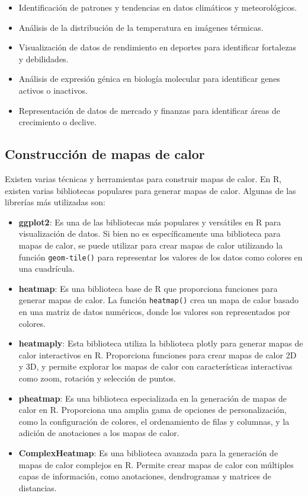 \documentclass{article}
\begin{document}
\begin{itemize}
    \item Identificación de patrones y tendencias en datos climáticos y meteorológicos.
    \item Análisis de la distribución de la temperatura en imágenes térmicas.
    \item Visualización de datos de rendimiento en deportes para identificar fortalezas y debilidades.
    \item Análisis de expresión génica en biología molecular para identificar genes activos o inactivos.
    \item Representación de datos de mercado y finanzas para identificar áreas de crecimiento o declive.
\end{itemize}

\subsection{Construcción de mapas de calor}

Existen varias técnicas y herramientas para construir mapas de calor. En R, existen varias bibliotecas populares para generar mapas de calor. Algunas de las librerías más utilizadas son:

\begin{itemize}
\item \textbf{ggplot2}: Es una de las bibliotecas más populares y versátiles en R para visualización de datos. Si bien no es específicamente una biblioteca para mapas de calor, se puede utilizar para crear mapas de calor utilizando la función \texttt{geom-tile()} para representar los valores de los datos como colores en una cuadrícula.

\item \textbf{heatmap}: Es una biblioteca base de R que proporciona funciones para generar mapas de calor. La función \texttt{heatmap()} crea un mapa de calor basado en una matriz de datos numéricos, donde los valores son representados por colores.

\item \textbf{heatmaply}: Esta biblioteca utiliza la biblioteca plotly para generar mapas de calor interactivos en R. Proporciona funciones para crear mapas de calor 2D y 3D, y permite explorar los mapas de calor con características interactivas como zoom, rotación y selección de puntos.

\item \textbf{pheatmap}: Es una biblioteca especializada en la generación de mapas de calor en R. Proporciona una amplia gama de opciones de personalización, como la configuración de colores, el ordenamiento de filas y columnas, y la adición de anotaciones a los mapas de calor.

\item \textbf{ComplexHeatmap}: Es una biblioteca avanzada para la generación de mapas de calor complejos en R. Permite crear mapas de calor con múltiples capas de información, como anotaciones, dendrogramas y matrices de distancias.
\end{itemize}
\end{document}

